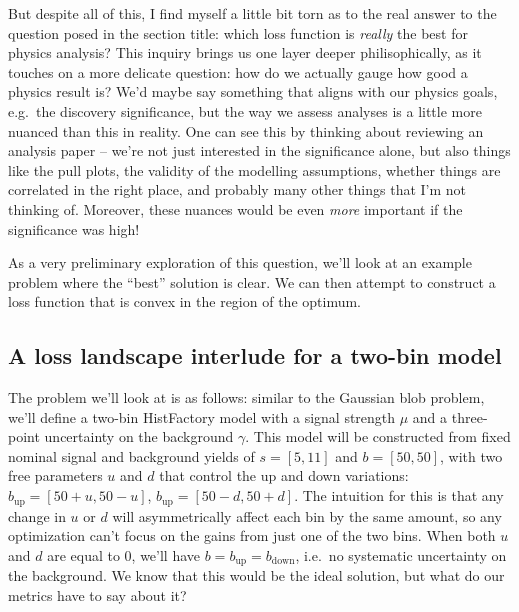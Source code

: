 \documentclass[
  11pt,
  numbers=noendperiod]{book}
\begin{document}
But despite all of this, I find myself a little bit torn as to the real
answer to the question posed in the section title: which loss function
is \emph{really} the best for physics analysis? This inquiry brings us
one layer deeper philisophically, as it touches on a more delicate
question: how do we actually gauge how good a physics result is? We'd
maybe say something that aligns with our physics goals, e.g.~the
discovery significance, but the way we assess analyses is a little more
nuanced than this in reality. One can see this by thinking about
reviewing an analysis paper -- we're not just interested in the
significance alone, but also things like the pull plots, the validity of
the modelling assumptions, whether things are correlated in the right
place, and probably many other things that I'm not thinking of.
Moreover, these nuances would be even \emph{more} important if the
significance was high!

As a very preliminary exploration of this question, we'll look at an
example problem where the ``best'' solution is clear. We can then
attempt to construct a loss function that is convex in the region of the
optimum.

\hypertarget{sec-which-loss-model}{%
\subsection{A loss landscape interlude for a two-bin
model}\label{sec-which-loss-model}}

The problem we'll look at is as follows: similar to the Gaussian blob
problem, we'll define a two-bin HistFactory model with a signal strength
\(\mu\) and a three-point uncertainty on the background \(\gamma\). This
model will be constructed from fixed nominal signal and background
yields of \(s = [5, 11]\) and \(b = [50, 50]\), with two free parameters
\(u\) and \(d\) that control the up and down variations:
\(b_{\mathrm{up}} = [50 + u, 50 -u ]\),
\(b_{\mathrm{up}} = [50 - d, 50 + d ]\). The intuition for this is that
any change in \(u\) or \(d\) will asymmetrically affect each bin by the
same amount, so any optimization can't focus on the gains from just one
of the two bins. When both \(u\) and \(d\) are equal to 0, we'll have
\(b = b_{\mathrm{up}} = b_{\mathrm{down}}\), i.e.~no systematic
uncertainty on the background. We know that this would be the ideal
solution, but what do our metrics have to say about it?
\end{document}
